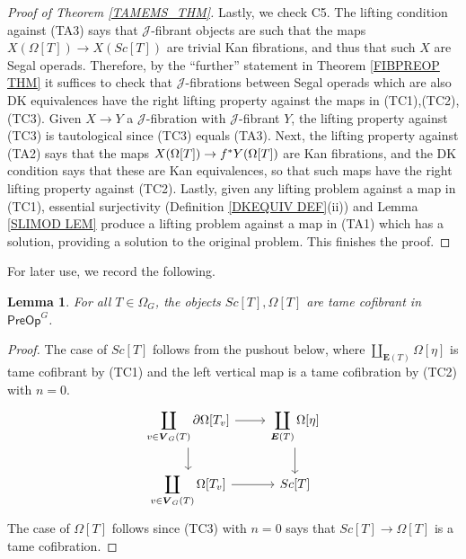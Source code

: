 \documentclass[a4paper,10pt
,draft
]{article}%
\numberwithin{equation}{section}
\numberwithin{figure}{section}
\newtheorem{lemma}[equation]{Lemma}%
\theoremstyle{definition} %
\newcommand{\1}{\ensuremath{\mathbbm 1}}%
\begin{document}
\begin{proof}[Proof of Theorem \ref{TAMEMS_THM}]
	
Lastly, we check C5.
The lifting condition against (TA3) says that 
$\mathcal{J}$-fibrant objects are such that the maps $X(\Omega[T]) \to X(Sc[T])$
are trivial Kan fibrations, and thus that such $X$ are Segal operads.
Therefore, by the ``further'' statement in
Theorem \ref{FIBPREOP THM} 
it suffices to check that $\mathcal{J}$-fibrations
between Segal operads which are also DK equivalences have the right lifting property against the maps in (TC1),(TC2),(TC3).
Given $X \to Y$ a $\mathcal{J}$-fibration with 
$\mathcal{J}$-fibrant $Y$,
the lifting property against (TC3) is tautological since 
(TC3) equals (TA3).
Next, the lifting property against (TA2) says that the maps
$X(\Omega[T]) \to f^{\**} Y(\Omega[T])$
are Kan fibrations, and the DK condition says that these are Kan equivalences,
so that such maps have the right lifting property against (TC2).
Lastly, given any lifting problem against a map in (TC1),
essential surjectivity (Definition \ref{DKEQUIV DEF}(ii))
 and Lemma \ref{SLIMOD LEM}
produce a lifting problem against a map in (TA1) which has a solution, providing a solution to the original problem.
%
This finishes the proof.	
\end{proof}



For later use, we record the following.

\begin{lemma}\label{OMEGATTAME_LEM}
	For all $T \in \Omega_G$, the objects $Sc[T],\Omega[T]$ are tame cofibrant in $\mathsf{PreOp}^G$.
\end{lemma}

\begin{proof}
	The case of $Sc[T]$ follows from the pushout below, 
	where $\coprod_{\boldsymbol{E}(T)}\Omega[\eta]$
	is tame cofibrant by (TC1) and the left vertical map is 
	a tame cofibration by (TC2) with $n=0$.
	\[
	\begin{tikzcd}
	\displaystyle{
		\coprod_{v \in \boldsymbol{V}_G(T)} \partial\Omega[T_{v}]
	}
	\arrow[d] \arrow[r]
	&
	\displaystyle{
		\coprod_{\boldsymbol{E}(T)} \Omega[\eta]
	}
	\arrow[d]
	\\
	\displaystyle{
		\coprod_{v \in \boldsymbol{V}_G(T)} \Omega[T_{v}]
	}
	\arrow[r]
	&
	Sc[T]
	\end{tikzcd}
	\]
	The case of $\Omega[T]$
	follows since (TC3) with $n=0$
	says that $Sc[T] \to \Omega[T]$ is a tame cofibration.
\end{proof}
\end{document}
